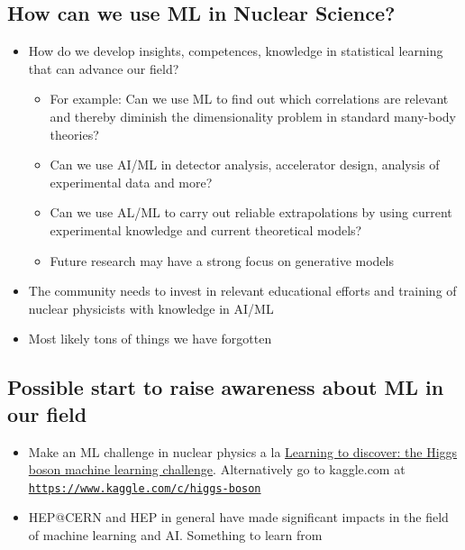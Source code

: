\documentclass[%
oneside,                 %
final,                   %
10pt]{article}
\begin{document}
\subsection{How can we use ML in Nuclear Science?}
\begin{block}{}
\begin{itemize}
\item How do we develop insights, competences, knowledge in statistical learning that can advance our field?
\begin{itemize}

  \item For example: Can we use ML to find out which correlations are relevant and thereby diminish the dimensionality problem in standard many-body  theories?

  \item Can we use AI/ML in detector analysis, accelerator design, analysis of experimental data and more?

  \item Can we use AL/ML to carry out reliable extrapolations by using current experimental knowledge and current theoretical models?

  \item Future research may have a strong focus on generative models

\end{itemize}

\noindent
\item The community needs to invest in relevant educational efforts and training of nuclear physicists with knowledge in AI/ML

\item Most likely tons of things we have forgotten
\end{itemize}

\noindent
\end{block}

\subsection{Possible start to raise awareness about ML in our field}
\begin{block}{}
\begin{itemize}
\item Make an ML challenge in nuclear physics a la \href{{https://home.cern/news/news/computing/higgs-boson-machine-learning-challenge}}{Learning to discover: the Higgs boson machine learning challenge}. Alternatively go to kaggle.com at \href{{https://www.kaggle.com/c/higgs-boson}}{\nolinkurl{https://www.kaggle.com/c/higgs-boson}}

\item HEP@CERN and HEP in general have made significant impacts in the field of machine learning and AI. Something to learn from
\end{itemize}

\noindent
\end{block}
\end{document}
